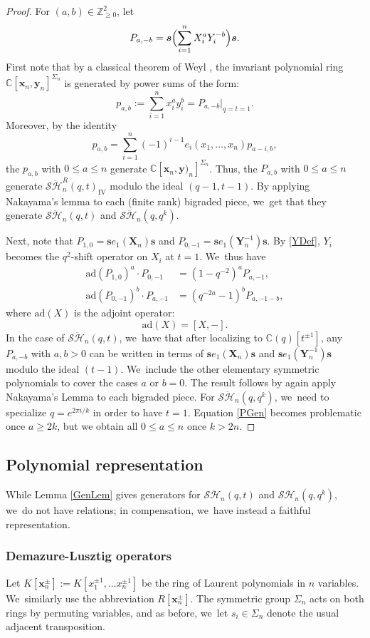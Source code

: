 \documentclass[JEP,XML,SOM,Unicode,published]{cedram}
\theoremstyle{definition}
\newcommand{\ZZ}{\mathbb{Z}}
\newcommand{\CC}{\mathbb{C}}
\newcommand{\SHH}{\mathcal{S}\ddot{\mathcal{H}}}
\newcommand{\ee}{\boldsymbol{s}}
\newcommand{\xx}{\boldsymbol{x}}
\newcommand{\ad}{\mathrm{ad}}
\begin{document}
\begin{proof}
For $(a,b)\in\ZZ_{\ge 0}^2$, let
\[
P_{a,-b}=\ee\Bigl(\sum_{i=1}^nX_i^aY_i^{-b}\Bigr)\ee.
\]
First note that by a classical theorem of Weyl \cite{WeylInv}, the invariant polynomial ring $\CC[\boldsymbol{x}_n,\boldsymbol{y}_n]^{\Sigma_n}$ is generated by power sums of the form:
\[
p_{a,b}:=\sum_{i=1}^n x_i^ay_i^{b}=P_{a,-b}\big|_{q=t=1}.
\]
Moreover, by the identity
\[
p_{a,b}=\sum_{i=1}^n(-1)^{i-1}e_i(x_1,\ldots, x_n)p_{a-i,b},
\]
the $p_{a,b}$ with $0\le a\le n$ generate $\CC[\boldsymbol{x}_n,\boldsymbol{y})_n]^{\Sigma_n}$.
Thus, the $P_{a,b}$ with $0\le a\le n$ generate $\SHH_n^R(q,t)_{\mathrm{IV}}$ modulo the ideal $(q-1, t-1)$.
By applying Nakayama's lemma to each (finite rank) bigraded piece, we~get that they generate $\SHH_n(q,t)$ and $\SHH_n(q,q^k)$.

Next, note that $P_{1,0}=\ee e_1(\boldsymbol{X}_n)\ee$ and $P_{0,-1}=\ee e_1(\boldsymbol{Y}_n^{-1})\ee$.
By \eqref{YDef}, $Y_i$ becomes the $q^2$-shift operator on $X_i$ at $t=1$. We~thus have
\begin{align}
\nonumber
\ad\left(P_{1,0} \right)^a\cdot P_{0,-1}&= (1-q^{-2})^aP_{a, -1},\\
\ad\left(P_{0,-1} \right)^b \cdot P_{a, -1}&= (q^{-2a}-1)^bP_{a, -1-b},
\label{PGen}
\end{align}
where $\ad\left(X \right)$ is the adjoint operator:
\[
\ad\left(X \right)=[X,-].
\]
In the case of $\SHH_n(q,t)$, we~have that after localizing to $\CC(q)[t^{\pm 1}]$, any $P_{a,-b}$ with $a,b>0$ can be written in terms of $\ee e_1(\boldsymbol{X}_n)\ee$ and $\ee e_1(\boldsymbol{Y}_n^{-1})\ee$ modulo the ideal $(t-1)$. We~include the other elementary symmetric polynomials to cover the cases $a$ or $b=0$.
The result follows by again apply Nakayama's Lemma to each bigraded piece.
For $\SHH_n(q,q^k)$, we~need to specialize $q=e^{2\pi i/k}$ in order to have $t=1$.
Equation \eqref{PGen} becomes problematic once $a\ge 2k$, but we obtain all $0\le a\le n$ once $k> 2n$.
\end{proof}

\subsection{Polynomial representation}\label{PolRep}
While Lemma \ref{GenLem} gives generators for $\SHH_n(q,t)$ and $\SHH_n(q,q^k)$, we~do not have relations; in compensation, we~have instead a faithful representation.

\subsubsection{Demazure-Lusztig operators}
Let $K[\xx_n^\pm]:=K[x_1^{\pm 1},\ldots x_{n}^{\pm 1}]$ be the ring of Laurent polynomials in $n$ variables. We~similarly use the abbreviation $R[\xx_n^\pm]$.
The symmetric group $\Sigma_n$ acts on both rings by permuting variables, and as before, we~let $s_i\in\Sigma_n$ denote the usual adjacent transposition.
\end{document}
